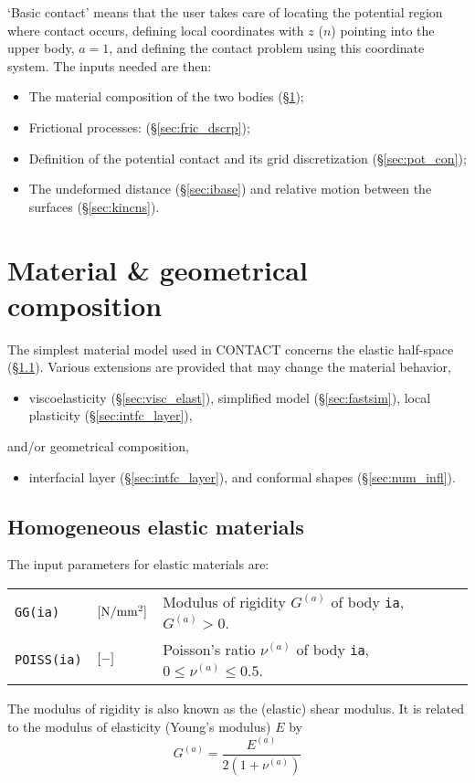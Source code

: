 \documentclass[12pt]{report}
\newcommand{\var}[1]{\mbox{\tt #1}}
\newenvironment{inputvars}{\vspace{0.4\baselineskip}%

\begin{tabular}{>{\raggedright}p{22mm}p{19mm}p{113mm}}}{
\end{tabular}

}
\newcommand{\inpvar}[3]{{\small\tt #1} & $#2$ & #3 \\[1ex]}
\begin{document}
`Basic contact' means that the user takes care of locating the potential
region where contact occurs, defining local coordinates with $z$ ($n$)
pointing into the upper body, $a=1$, and defining the contact problem using
this coordinate system. The inputs needed are then:
\begin{itemize}
\item The material composition of the two bodies (\S \ref{sec:matcns});
\item Frictional processes: (\S \ref{sec:fric_dscrp});
\item Definition of the potential contact and its grid discretization
        (\S \ref{sec:pot_con});
\item The undeformed distance (\S \ref{sec:ibase}) and relative motion
        between the surfaces (\S \ref{sec:kincns}).
\end{itemize}

\section{Material \& geometrical composition}
\label{sec:matcns}

The simplest material model used in CONTACT concerns the elastic
half-space (\S \ref{sec:lin_elast}). Various extensions are provided
that may change the material behavior,
\begin{itemize}
\item viscoelasticity (\S \ref{sec:visc_elast}), 
        simplified model (\S \ref{sec:fastsim}), 
        local plasticity (\S \ref{sec:intfc_layer}),
\end{itemize}
and/or geometrical composition,
\begin{itemize}
\item interfacial layer (\S \ref{sec:intfc_layer}), and
        conformal shapes (\S \ref{sec:num_infl}).
\end{itemize}

\subsection{Homogeneous elastic materials}
\label{sec:lin_elast}

The input parameters for elastic materials are:
\begin{inputvars}
\inpvar{GG(ia)}{\bunit{N/mm^2}}{Modulus of rigidity $G^{(a)}$ of body \var{ia},
        $G^{(a)} > 0$.}
\inpvar{POISS(ia)}{\bunit{-}}{Poisson's ratio $\nu^{(a)}$ of body \var{ia},
        $0\le\nu^{(a)}\le 0.5$.}
\end{inputvars}
The modulus of rigidity is also known as the (elastic) shear modulus. It is
related to the modulus of elasticity (Young's modulus) $E$ by
\begin{equation}
  G^{(a)} = \frac{E^{(a)}}{2(1+\nu^{(a)})}
\end{equation}
\end{document}
